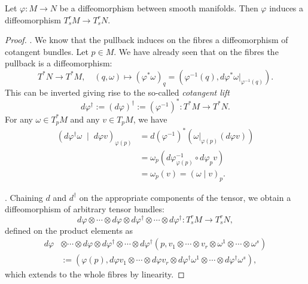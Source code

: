 \begin{proposition}
  Let $\varphi:M\to N$ be a diffeomorphism between smooth manifolds.
  Then $\varphi$ induces a diffeomorphism $T_s^rM \to T_s^r N$.
\end{proposition}
\begin{proof}
.
We know that the pullback induces on the fibres a diffeomorphism of cotangent bundles. Let $p\in M$.
We have already seen that on the fibres the pullback is a diffeomorphism:
\begin{equation}
  T^*N \to T^* M, \quad
  (q,\omega) \mapsto (\varphi^*\omega)_q = \left(\varphi^{-1}(q), d\varphi^*\omega|_{\varphi^{-1}(q)}\right).
\end{equation}
This can be inverted giving rise to the so-called \emph{cotangent lift}
\begin{equation}
  d\varphi^\dagger :=(d\varphi)^\dagger := (\varphi^{-1})^*: T^*M \to T^*N.
\end{equation}
For any $\omega\in T_p^* M$ and any $v\in T_pM$, we have
\begin{align}
  (d\varphi^\dagger \omega \;\mid\; d\varphi v)_{\varphi(p)} &=  d(\varphi^{-1})^*(\omega|_{\varphi(p)} (d\varphi v) )\\
  &= \omega_p(d\varphi^{-1}_{\varphi(p)} \circ d\varphi_p v ) \\
  &= \omega_p(v) = (\omega \mid v)_p.
\end{align}

.
Chaining $d$ and $d^\dagger$ on the appropriate components of the tensor, we obtain a diffeomorphism of arbitrary tensor bundles:
\begin{equation}
  d\varphi \otimes\cdots\otimes d\varphi \otimes d\varphi^\dagger \otimes\cdots\otimes d\varphi^\dagger  : T_s^rM \to T_s^r N,
\end{equation}
defined on the product elements as
\begin{align}
  d\varphi &\otimes\cdots\otimes d\varphi \otimes d\varphi^\dagger \otimes\cdots\otimes d\varphi^\dagger  (p, v_1 \otimes \cdots\otimes v_r \otimes \omega^1\otimes\cdots\otimes\omega^s) \\
  &:= (\varphi(p), d\varphi v_1 \otimes \cdots\otimes d\varphi v_r \otimes d\varphi^\dagger \omega^1\otimes\cdots\otimes d\varphi^\dagger \omega^s),
\end{align}
which extends to the whole fibres by linearity.
\end{proof}

